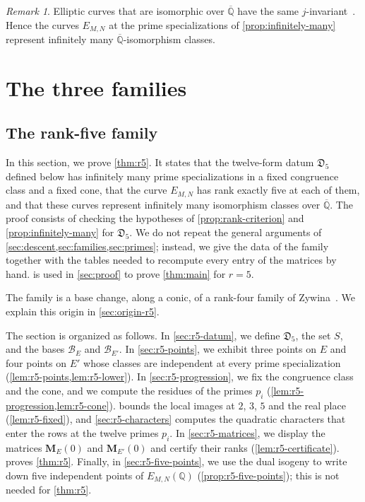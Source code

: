 \documentclass[12pt,oneside,openany]{book}
\theoremstyle{definition}
\theoremstyle{plain}
\numberwithin{equation}{chapter}
\theoremstyle{plain}
\theoremstyle{definition}
\theoremstyle{remark}
\newtheorem{remark}[remark]{Remark}
\newcommand{\Q}{\mathbb Q}
\newcommand{\Qbar}{\overline{\mathbb Q}}
\newcommand{\datum}{\mathfrak D}
\newcommand{\cB}{\mathcal B}
\begin{document}
\begin{remark}\label{rem:geometric-classes}
Elliptic curves that are isomorphic over $\Qbar$ have the same $j$-invariant~\cite[Proposition~III.1.4(b)]{SilvermanAEC}. %
Hence the curves $E_{M,N}$ at the prime specializations of \cref{prop:infinitely-many} represent infinitely many $\Qbar$-isomorphism classes.
\end{remark}

\part{The three families}\label{part:families}
\chapter{The rank-five family}\label{sec:rank5}

In this section, we prove \cref{thm:r5}. It states that the twelve-form datum $\datum_5$ defined below has infinitely many prime specializations in a fixed congruence class and a fixed cone, that the curve $E_{M,N}$ has rank exactly five at each of them, and that these curves represent infinitely many isomorphism classes over $\Qbar$. The proof consists of checking the hypotheses of \cref{prop:rank-criterion} and \cref{prop:infinitely-many} for $\datum_5$. We do not repeat the general arguments of \cref{sec:descent,sec:families,sec:primes}; instead, we give the data of the family together with the tables needed to recompute every entry of the matrices by hand.  is used in \cref{sec:proof} to prove \cref{thm:main} for $r=5$.

The family is a base change, along a conic, of a rank-four family of Zywina~\cite[\S6.5]{Zywina2026}. We explain this origin in \cref{sec:origin-r5}.

The section is organized as follows. In \cref{sec:r5-datum}, we define $\datum_5$, the set $S$, and the bases $\cB_E$ and $\cB_{E'}$. In \cref{sec:r5-points}, we exhibit three points on $E$ and four points on $E'$ whose classes are independent at every prime specialization (\cref{lem:r5-points,lem:r5-lower}). In \cref{sec:r5-progression}, we fix the congruence class and the cone, and we compute the residues of the primes $p_i$ (\cref{lem:r5-progression,lem:r5-cone}).  bounds the local images at $2$, $3$, $5$ and the real place (\cref{lem:r5-fixed}), and \cref{sec:r5-characters} computes the quadratic characters that enter the rows at the twelve primes $p_i$. In \cref{sec:r5-matrices}, we display the matrices $\mathbf M_E(0)$ and $\mathbf M_{E'}(0)$ and certify their ranks (\cref{lem:r5-certificate}).  proves \cref{thm:r5}. Finally, in \cref{sec:r5-five-points}, we use the dual isogeny to write down five independent points of $E_{M,N}(\Q)$ (\cref{prop:r5-five-points}); this is not needed for \cref{thm:r5}.
\end{document}
